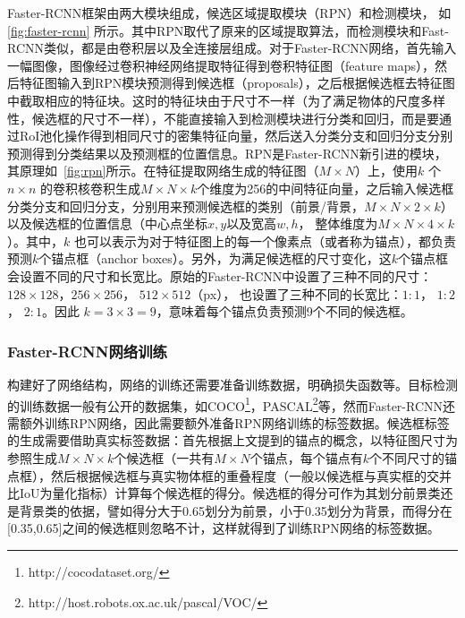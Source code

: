 Faster-RCNN框架由两大模块组成，候选区域提取模块（RPN）和检测模块， 如 \figurename \, \ref{fig:faster-rcnn} 所示。其中RPN取代了原来的区域提取算法，而检测模块和Fast-RCNN类似，都是由卷积层以及全连接层组成。对于Faster-RCNN网络，首先输入一幅图像，图像经过卷积神经网络提取特征得到卷积特征图（feature maps），然后特征图输入到RPN模块预测得到候选框（proposals），之后根据候选框去特征图中截取相应的特征块。这时的特征块由于尺寸不一样（为了满足物体的尺度多样性，候选框的尺寸不一样），不能直接输入到检测模块进行分类和回归，而是要通过RoI池化操作得到相同尺寸的密集特征向量，然后送入分类分支和回归分支分别预测得到分类结果以及预测框的位置信息。RPN是Faster-RCNN新引进的模块，其原理如\figurename \, \ref{fig:rpn}所示。在特征提取网络生成的特征图（$M \times N$）上，使用$k$ 个 $n \times n$ 的卷积核卷积生成$M \times N \times k$个维度为256的中间特征向量，之后输入候选框分类分支和回归分支，分别用来预测候选框的类别（前景/背景，$M \times N \times 2 \times k$）以及候选框的位置信息（中心点坐标$x, y$以及宽高$w, h$， 整体维度为$M \times N \times 4 \times k$）。其中，$k$ 也可以表示为对于特征图上的每一个像素点（或者称为锚点），都负责预测$k$个锚点框（anchor boxes）。另外，为满足候选框的尺寸变化，这$k$个锚点框会设置不同的尺寸和长宽比。原始的Faster-RCNN中设置了三种不同的尺寸：$128\times 128$，$256 \times 256$， $512 \times 512$（px）， 也设置了三种不同的长宽比：$1:1$， $1:2$， $2:1$。因此 $k = 3 \times 3 = 9$，意味着每个锚点负责预测9个不同的候选框。

\subsubsection{Faster-RCNN网络训练}
构建好了网络结构，网络的训练还需要准备训练数据，明确损失函数等。目标检测的训练数据一般有公开的数据集，如COCO\footnote[5]{http://cocodataset.org/}，PASCAL\footnote[6]{http://host.robots.ox.ac.uk/pascal/VOC/}等，然而Faster-RCNN还需额外训练RPN网络，因此需要额外准备RPN网络训练的标签数据。候选框标签的生成需要借助真实标签数据：首先根据上文提到的锚点的概念，以特征图尺寸为参照生成$M \times N \times k$个候选框（一共有$M \times N$个锚点，每个锚点有$k$个不同尺寸的锚点框），然后根据候选框与真实物体框的重叠程度（一般以候选框与真实框的交并比IoU为量化指标）计算每个候选框的得分。候选框的得分可作为其划分前景类还是背景类的依据，譬如得分大于0.65划分为前景，小于0.35划分为背景，而得分在[0.35,0.65]之间的候选框则忽略不计，这样就得到了训练RPN网络的标签数据。



